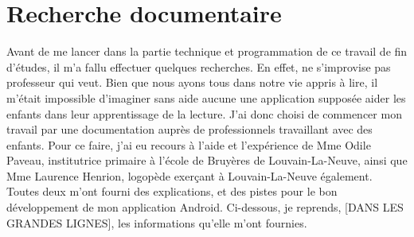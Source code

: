 \section{Recherche documentaire}
Avant de me lancer dans la partie technique et programmation de ce travail de fin d'études, il m'a fallu effectuer quelques recherches. En effet, ne s'improvise pas professeur qui veut. Bien que nous ayons tous dans notre vie appris à lire, il m'était impossible d'imaginer sans aide aucune une application supposée aider les enfants dans leur apprentissage de la lecture. J'ai donc choisi de commencer mon travail par une documentation auprès de professionnels travaillant avec des enfants. Pour ce faire, j'ai eu recours à l'aide et l'expérience de Mme Odile Paveau, institutrice primaire à l'école de Bruyères de Louvain-La-Neuve, ainsi que Mme Laurence Henrion, logopède exerçant à Louvain-La-Neuve également. Toutes deux m'ont fourni des explications, et des pistes pour le bon développement de mon application Android. Ci-dessous, je reprends, 
[DANS LES GRANDES LIGNES], les informations qu'elle m'ont fournies.